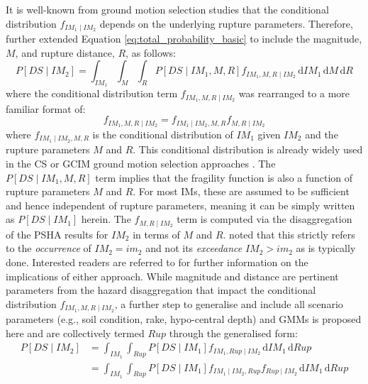 It is well-known from ground motion selection studies that the conditional distribution $f_{IM_1 \mid IM_2}$ depends on the underlying rupture parameters. Therefore, \citet{Suzuki2020} further extended Equation \eqref{eq:total_probability_basic} to include the magnitude, $M$, and rupture distance, $R$, as follows:
\begin{equation}
    \label{eq:suzuki_extension}
    P[DS \mid IM_2] = \int_{IM_1}\int_{M}\int_{R} P[DS \mid IM_1, M, R] f_{IM_1, M, R \mid IM_2} \, \mathrm{d}IM_1 \, \mathrm{d}M \, \mathrm{d}R
\end{equation}
where the conditional distribution term $f_{IM_1, M, R \mid  IM_2 }$ was rearranged to a more familiar format of:
\begin{equation}
    \label{eq:suzuki_eq2b}
    f_{IM_1, M, R \mid IM_2} = f_{IM_1 \mid IM_2, M, R}f_{M, R \mid IM_2}
\end{equation}
where $f_{IM_1\mid IM_2, M, R}$ is the conditional distribution of $IM_1$ given $IM_2$ and the rupture parameters $M$ and $R$. This conditional distribution is already widely used in the \ac{CS} or \ac{GCIM} ground motion selection approaches \citep{Lin2013_pt1, Bradley2010a}. The $P[DS \mid IM_1, M, R]$ term implies that the fragility function is also a function of rupture parameters $M$ and $R$. For most \acp{IM}, these are assumed to be sufficient \citep{Luco2007a} and hence independent of rupture parameters, meaning it can be simply written as $P[DS \mid IM_1] $ herein. The $f_{M, R \mid IM_2}$ term is computed via the disaggregation of the \ac{PSHA} results for $IM_2$ in terms of $M$ and $R$. \citet{Suzuki2020} noted that this strictly refers to the \textit{occurrence} of $IM_2 = im_2$ and not its \textit{exceedance} $IM_2 > im_2$ as is typically done. Interested readers are referred to \citet{Fox2016} for further information on the implications of either approach. While magnitude and distance are pertinent parameters from the hazard disaggregation that impact the conditional distribution $f_{IM_1, M, R \mid IM_2}$, a further step to generalise and include all scenario parameters (e.g., soil condition, rake, hypo-central depth) and \acp{GMM} is proposed here and are collectively termed $Rup$ through the generalised form:
\begin{equation}
    \label{eq:proposed-ff}
    \begin{aligned}
        P[DS \mid IM_2] &= \int_{IM_1}\int_{Rup} P[DS \mid IM_1] f_{IM_1, Rup \mid IM_2} \, \mathrm{d}IM_1 \, \mathrm{d}Rup\\
                    &= \int_{IM_1}\int_{Rup} P[DS \mid IM_1] f_{IM_1 \mid IM_2, Rup}f_{Rup \mid IM_2} \, \mathrm{d}IM_1 \, \mathrm{d}Rup
    \end{aligned}
\end{equation}

